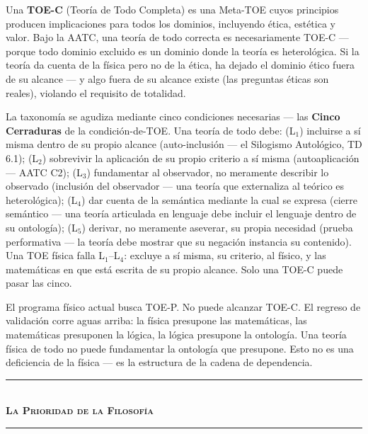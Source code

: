 \documentclass[10pt, openany, oneside]{book}
\renewcommand{\normalsize}{\fontsize{10}{13}\selectfont}
\begin{document}
Una \textbf{TOE-C} (Teoría de Todo Completa) es una Meta-TOE cuyos principios producen implicaciones para todos los dominios, incluyendo ética, estética y valor. Bajo la AATC, una teoría de todo correcta es necesariamente TOE-C --- porque todo dominio excluido es un dominio donde la teoría es heterológica. Si la teoría da cuenta de la física pero no de la ética, ha dejado el dominio ético fuera de su alcance --- y algo fuera de su alcance existe (las preguntas éticas son reales), violando el requisito de totalidad.

La taxonomía se agudiza mediante cinco condiciones necesarias --- las \textbf{Cinco Cerraduras} de la condición-de-TOE. Una teoría de todo debe: (L$_1$) incluirse a sí misma dentro de su propio alcance (auto-inclusión --- el Silogismo Autológico, TD 6.1); (L$_2$) sobrevivir la aplicación de su propio criterio a sí misma (autoaplicación --- AATC C2); (L$_3$) fundamentar al observador, no meramente describir lo observado (inclusión del observador --- una teoría que externaliza al teórico es heterológica); (L$_4$) dar cuenta de la semántica mediante la cual se expresa (cierre semántico --- una teoría articulada en lenguaje debe incluir el lenguaje dentro de su ontología); (L$_5$) derivar, no meramente aseverar, su propia necesidad (prueba performativa --- la teoría debe mostrar que su negación instancia su contenido). Una TOE física falla L$_1$--L$_4$: excluye a sí misma, su criterio, al físico, y las matemáticas en que está escrita de su propio alcance. Solo una TOE-C puede pasar las cinco.

El programa físico actual busca TOE-P. No puede alcanzar TOE-C. El regreso de validación corre aguas arriba: la física presupone las matemáticas, las matemáticas presuponen la lógica, la lógica presupone la ontología. Una teoría física de todo no puede fundamentar la ontología que presupone. Esto no es una deficiencia de la física --- es la estructura de la cadena de dependencia.

\vspace{1.5em}


\begin{center}
    \rule{0.3\textwidth}{0.4pt}\\[0.5em]
    {\normalsize\bfseries\scshape La Prioridad de la Filosofía}\\[0.3em]
    \rule{0.3\textwidth}{0.4pt}
\end{center}
\end{document}
